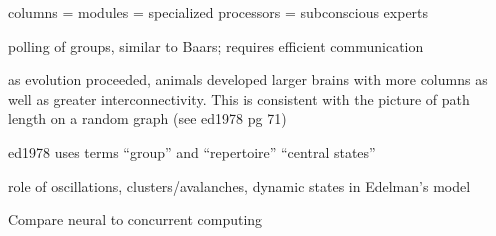 \vspace{3em}
columns = modules = specialized processors = subconscious experts

\vspace{3em}
\cite{ed1978} polling of groups, similar to Baars; requires efficient communication

\vspace{3em}
as evolution proceeded, animals developed larger brains with more columns as well as greater interconnectivity. This is consistent with the picture of path length on a random graph (see ed1978 pg 71)

\vspace{3em}
ed1978 uses terms ``group'' and ``repertoire'' ``central states''

\vspace{3em}
role of oscillations, clusters/avalanches, dynamic states in Edelman's model

\vspace{3em}
Compare neural to concurrent computing